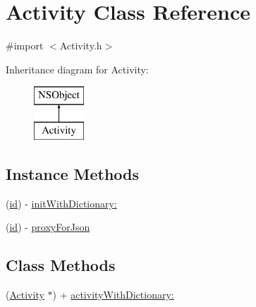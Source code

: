 \hypertarget{interface_activity}{\section{Activity Class Reference}
\label{interface_activity}
}


{\ttfamily \#import $<$Activity.\-h$>$}

Inheritance diagram for Activity\-:\begin{figure}[H]
\begin{center}
\leavevmode
\includegraphics[height=2.000000cm]{interface_activity}
\end{center}
\end{figure}
\subsection*{Instance Methods}
\begin{DoxyCompactItemize}
\item 
(\hyperlink{interface_activity_a84ac9c4a42c6b67f863bea5839146274}{id}) -\/ \hyperlink{interface_activity_a6c48ff0b7f9d7c7ebd6a6e7d7db0a11e}{init\-With\-Dictionary\-:}
\item 
(\hyperlink{interface_activity_a84ac9c4a42c6b67f863bea5839146274}{id}) -\/ \hyperlink{interface_activity_a94321b2e4d33f840fbe3dbf9cb49abdc}{proxy\-For\-Json}
\end{DoxyCompactItemize}
\subsection*{Class Methods}
\begin{DoxyCompactItemize}
\item 
(\hyperlink{interface_activity}{Activity} $\ast$) + \hyperlink{interface_activity_acf82e4129c89f266ead77a540b943393}{activity\-With\-Dictionary\-:}
\end{DoxyCompactItemize}
